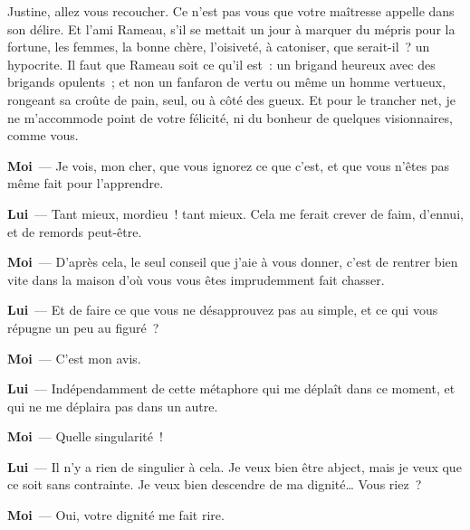 \documentclass[french,twoside]{book} %
\newcommand{\labelchar}[1]{\textbf{\color{rubric} #1}}
\begin{document}
Justine, allez vous recoucher. Ce n’est pas vous que votre maîtresse appelle dans son délire. Et l’ami Rameau, s’il se mettait un jour à marquer du mépris pour la fortune, les femmes, la bonne chère, l’oisiveté, à catoniser, que serait-il ? un hypocrite. Il faut que Rameau soit ce qu’il est : un brigand heureux avec des brigands opulents ; et non un fanfaron de vertu ou même un homme vertueux, rongeant sa croûte de pain, seul, ou à côté des gueux. Et pour le trancher net, je ne m’accommode point de votre félicité, ni du bonheur de quelques visionnaires, comme vous.\par
\labelchar{Moi} — Je vois, mon cher, que vous ignorez ce que c’est, et que vous n’êtes pas même fait pour l’apprendre.\par
\labelchar{Lui} — Tant mieux, mordieu ! tant mieux. Cela me ferait crever de faim, d’ennui, et de remords peut-être.\par
\labelchar{Moi} — D’après cela, le seul conseil que j’aie à vous donner, c’est de rentrer bien vite dans la maison d’où vous vous êtes imprudemment fait chasser.\par
\labelchar{Lui} — Et de faire ce que vous ne désapprouvez pas au simple, et ce qui vous répugne un peu au figuré ?\par
\labelchar{Moi} — C’est mon avis.\par
\labelchar{Lui} — Indépendamment de cette métaphore qui me déplaît dans ce moment, et qui ne me déplaira pas dans un autre.\par
\labelchar{Moi} — Quelle singularité !\par
\labelchar{Lui} — Il n’y a rien de singulier à cela. Je veux bien être abject, mais je veux que ce soit sans contrainte. Je veux bien descendre de ma dignité… Vous riez ?\par
\labelchar{Moi} — Oui, votre dignité me fait rire.\par
\end{document}
